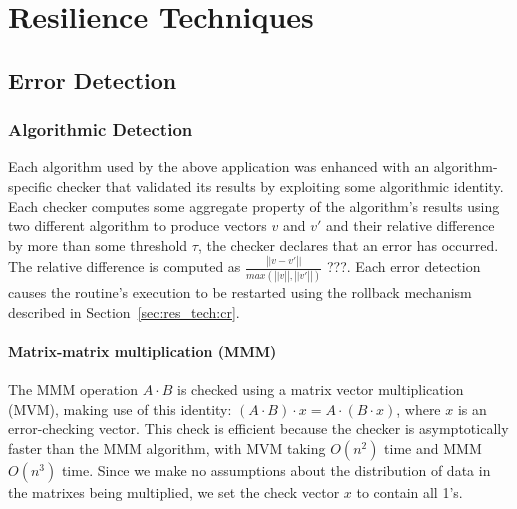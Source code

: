 \documentclass{sig-alternate}
\newcommand{\sui}[1]{%
  \textcolor{green}{SC - #1}
}
\begin{document}
\section{Resilience Techniques}
\label{sec:res_tech}

\subsection{Error Detection}
\label{sec:res_tech:err_det}

\subsubsection{Algorithmic Detection}
\label{sec:res_tech:err_det:algo}


Each algorithm used by the above application was enhanced with an algorithm-specific checker that validated its results by exploiting some algorithmic identity.
Each checker computes some aggregate property of the algorithm's results using two different algorithm to produce vectors $v$ and $v'$ and their relative difference by more than some threshold $\tau$, the checker declares that an error has occurred.
The relative difference is computed as $\frac{\left|| v-v' \right||}{max(\left||v\right||, \left||v'\right||)}$ ???.
Each error detection causes the routine's execution to be restarted using the rollback mechanism described in Section~\ref{sec:res_tech:cr}.

\paragraph{Matrix-matrix multiplication (MMM)}
The MMM operation $A \cdot B$ is checked using a matrix vector multiplication (MVM), making use of this identity: $(A \cdot B) \cdot x = A \cdot (B \cdot x)$, where $x$ is an error-checking vector.
This check is efficient because the checker is asymptotically faster than the MMM algorithm, with MVM taking $O(n^2)$ time and MMM $O(n^3)$ time.
Since we make no assumptions about the distribution of data in the matrixes being multiplied, we set the check vector $x$ to contain all 1's.
\end{document}

